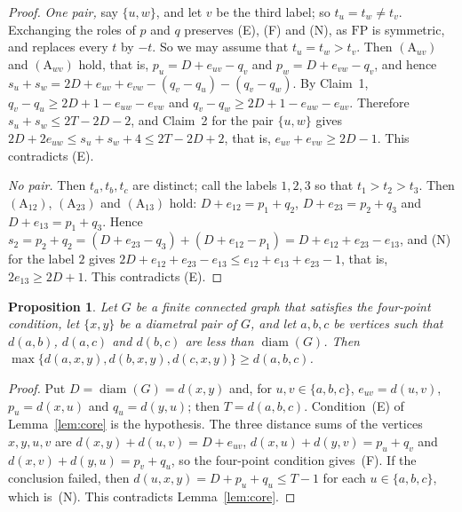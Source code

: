 \documentclass[11pt]{article}
\newtheorem{proposition}[theorem]{Proposition}
\theoremstyle{remark}
\DeclareMathOperator{\diam}{diam}
\newcommand{\FP}{\mathrm{FP}}
\begin{document}
\begin{proof}
\emph{One pair,} say $\{u,w\}$, and let $v$ be the third label; so
$t_u=t_w\ne t_v$. Exchanging the roles of $p$ and $q$ preserves (E), (F) and
(N), as $\FP$ is symmetric, and replaces every $t$ by $-t$. So we may assume
that $t_u=t_w>t_v$. Then $(\mathrm A_{uv})$ and $(\mathrm A_{wv})$ hold, that
is, $p_u=D+e_{uv}-q_v$ and $p_w=D+e_{vw}-q_v$, and hence
$s_u+s_w=2D+e_{uv}+e_{vw}-(q_v-q_u)-(q_v-q_w)$. By Claim~1, $q_v-q_u\ge2D+1-e_{uw}-e_{vw}$ and $q_v-q_w\ge2D+1-e_{uw}-e_{uv}$.
Therefore $s_u+s_w\le2T-2D-2$, and Claim~2 for the pair $\{u,w\}$ gives
$2D+2e_{uw}\le s_u+s_w+4\le2T-2D+2$, that is, $e_{uv}+e_{vw}\ge2D-1$. This
contradicts (E).

\emph{No pair.} Then $t_a,t_b,t_c$ are distinct; call the labels $1,2,3$ so
that $t_1>t_2>t_3$. Then $(\mathrm A_{12})$, $(\mathrm A_{23})$ and
$(\mathrm A_{13})$ hold: $D+e_{12}=p_1+q_2$, $D+e_{23}=p_2+q_3$ and
$D+e_{13}=p_1+q_3$. Hence
$s_2=p_2+q_2=(D+e_{23}-q_3)+(D+e_{12}-p_1)=D+e_{12}+e_{23}-e_{13}$, and (N)
for the label $2$ gives $2D+e_{12}+e_{23}-e_{13}\le e_{12}+e_{13}+e_{23}-1$,
that is, $2e_{13}\ge2D+1$. This contradicts (E).
\end{proof}

\begin{proposition}\label{prop:ineq}
Let $G$ be a finite connected graph that satisfies the four-point condition, let
$\{x,y\}$ be a diametral pair of $G$, and let $a,b,c$ be vertices such that
$d(a,b)$, $d(a,c)$ and $d(b,c)$ are less than $\diam(G)$. Then
$\max\{d(a,x,y),d(b,x,y),d(c,x,y)\}\ge d(a,b,c)$.
\end{proposition}
\begin{proof}
Put $D=\diam(G)=d(x,y)$ and, for $u,v\in\{a,b,c\}$, $e_{uv}=d(u,v)$,
$p_u=d(x,u)$ and $q_u=d(y,u)$; then $T=d(a,b,c)$. Condition~(E) of
Lemma~\ref{lem:core} is the hypothesis. The three distance sums of the vertices
$x,y,u,v$ are $d(x,y)+d(u,v)=D+e_{uv}$, $d(x,u)+d(y,v)=p_u+q_v$ and
$d(x,v)+d(y,u)=p_v+q_u$, so the four-point condition gives~(F). If the
conclusion failed, then $d(u,x,y)=D+p_u+q_u\le T-1$ for each $u\in\{a,b,c\}$,
which is~(N). This contradicts Lemma~\ref{lem:core}.
\end{proof}
\end{document}
